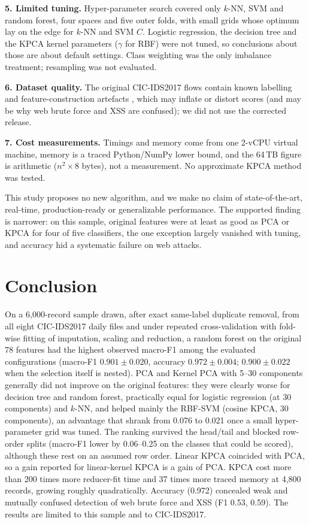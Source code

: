 \documentclass[conference,a4paper]{IEEEtran}
\begin{document}
\textbf{5. Limited tuning.} Hyper-parameter search covered only $k$-NN, SVM and random forest, four spaces and five outer folds, with small grids whose optimum lay on the edge for $k$-NN and SVM $C$. Logistic regression, the decision tree and the KPCA kernel parameters ($\gamma$ for RBF) were not tuned, so conclusions about those are about default settings. Class weighting was the only imbalance treatment; resampling was not evaluated.

\textbf{6. Dataset quality.} The original CIC-IDS2017 flows contain known labelling and feature-construction artefacts \cite{engelen2021}, which may inflate or distort scores (and may be why web brute force and XSS are confused); we did not use the corrected release.

\textbf{7. Cost measurements.} Timings and memory come from one 2-vCPU virtual machine, memory is a traced Python/NumPy lower bound, and the 64\,TB figure is arithmetic ($n^2\times8$ bytes), not a measurement. No approximate KPCA method was tested.

This study proposes no new algorithm, and we make no claim of state-of-the-art, real-time, production-ready or generalizable performance. The supported finding is narrower: on this sample, original features were at least as good as PCA or KPCA for four of five classifiers, the one exception largely vanished with tuning, and accuracy hid a systematic failure on web attacks.

\section{Conclusion}
On a 6{,}000-record sample drawn, after exact same-label duplicate removal, from all eight CIC-IDS2017 daily files and under repeated cross-validation with fold-wise fitting of imputation, scaling and reduction, a random forest on the original 78 features had the highest observed macro-F1 among the evaluated configurations (macro-F1 $0.901\pm0.020$, accuracy $0.972\pm0.004$; $0.900\pm0.022$ when the selection itself is nested). PCA and Kernel PCA with 5--30 components generally did not improve on the original features: they were clearly worse for decision tree and random forest, practically equal for logistic regression (at 30 components) and $k$-NN, and helped mainly the RBF-SVM (cosine KPCA, 30 components), an advantage that shrank from 0.076 to 0.021 once a small hyper-parameter grid was tuned. The ranking survived the head/tail and blocked row-order splits (macro-F1 lower by 0.06--0.25 on the classes that could be scored), although these rest on an assumed row order. Linear KPCA coincided with PCA, so a gain reported for linear-kernel KPCA is a gain of PCA. KPCA cost more than 200 times more reducer-fit time and 37 times more traced memory at 4{,}800 records, growing roughly quadratically. Accuracy (0.972) concealed weak and mutually confused detection of web brute force and XSS (F1 0.53, 0.59). The results are limited to this sample and to CIC-IDS2017.
\end{document}
